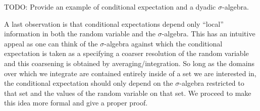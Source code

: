 TODO: Provide an example of conditional expectation and a dyadic
$\sigma$-algebra.

A last observation is that conditional expectations depend only 
``local'' information in both the random variable and the
$\sigma$-algebra.  This has an intuitive appeal as one can think of
the $\sigma$-algebra against which the conditional expectation is
taken as a specifying a coarser resolution of the random variable and
this coarsening is obtained by averaging/integration.  So long as the
domains over which we integrate are contained entirely inside of a
set we are interested in, the conditional expectation should only
depend on the $\sigma$-algebra restricted to that set and the values
of the random variable on that set.  We proceed to make this idea more
formal and give a proper proof.

